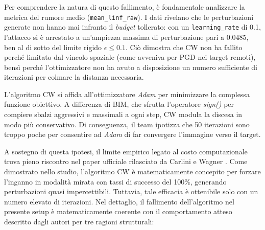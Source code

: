 \documentclass[a4paper, 12pt]{article}
\begin{document}
Per comprendere la natura di questo fallimento, è fondamentale analizzare la metrica del rumore medio (\texttt{mean\_linf\_raw}). I dati rivelano che le perturbazioni generate non hanno mai infranto il \textit{budget} tollerato: con un \texttt{learning\_rate} di 0.1, l'attacco si è arrestato a un'ampiezza massima di perturbazione pari a $0.0485$, ben al di sotto del limite rigido $\epsilon \le 0.1$. Ciò dimostra che CW non ha fallito perché limitato dal vincolo spaziale (come avveniva per PGD nei target remoti), bensì perché l'ottimizzatore non ha avuto a disposizione un numero sufficiente di iterazioni per colmare la distanza necessaria.

L'algoritmo CW si affida all'ottimizzatore \textit{Adam} per minimizzare la complessa funzione obiettivo. A differenza di BIM, che sfrutta l'operatore \textit{sign()} per compiere sbalzi aggressivi e massimali a ogni step, CW modula la discesa in modo più conservativo. Di conseguenza, il team ipotizza che 50 iterazioni sono troppo poche per consentire ad \textit{Adam} di far convergere l'immagine verso il target. 

A sostegno di questa ipotesi, il limite empirico legato al costo computazionale trova pieno riscontro nel paper ufficiale rilasciato da Carlini e Wagner \cite{carlini2017towards}. Come dimostrato nello studio, l'algoritmo CW è matematicamente concepito per forzare l'inganno in modalità mirata con tassi di successo del 100\%, generando perturbazioni quasi impercettibili. Tuttavia, tale efficacia è ottenibile solo con un numero elevato di iterazioni. Nel dettaglio, il fallimento dell'algoritmo nel presente setup è matematicamente coerente con il comportamento atteso descritto dagli autori per tre ragioni strutturali:
\end{document}
